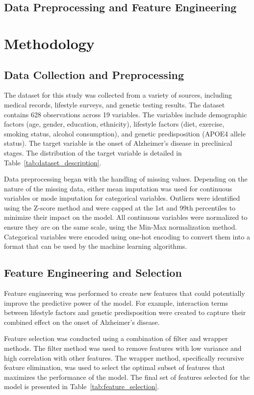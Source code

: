 \documentclass[conference]{IEEEtran}
\begin{document}
\subsection{Data Preprocessing and Feature Engineering}
\section{Methodology}

\subsection{Data Collection and Preprocessing}
The dataset for this study was collected from a variety of sources, including medical records, lifestyle surveys, and genetic testing results. The dataset contains 628 observations across 19 variables. The variables include demographic factors (age, gender, education, ethnicity), lifestyle factors (diet, exercise, smoking status, alcohol consumption), and genetic predisposition (APOE4 allele status). The target variable is the onset of Alzheimer's disease in preclinical stages. The distribution of the target variable is detailed in Table~\ref{tab:dataset_description}.

Data preprocessing began with the handling of missing values. Depending on the nature of the missing data, either mean imputation was used for continuous variables or mode imputation for categorical variables. Outliers were identified using the Z-score method and were capped at the 1st and 99th percentiles to minimize their impact on the model. All continuous variables were normalized to ensure they are on the same scale, using the Min-Max normalization method. Categorical variables were encoded using one-hot encoding to convert them into a format that can be used by the machine learning algorithms.

\subsection{Feature Engineering and Selection}
Feature engineering was performed to create new features that could potentially improve the predictive power of the model. For example, interaction terms between lifestyle factors and genetic predisposition were created to capture their combined effect on the onset of Alzheimer's disease. 

Feature selection was conducted using a combination of filter and wrapper methods. The filter method was used to remove features with low variance and high correlation with other features. The wrapper method, specifically recursive feature elimination, was used to select the optimal subset of features that maximizes the performance of the model. The final set of features selected for the model is presented in Table~\ref{tab:feature_selection}.
\end{document}
